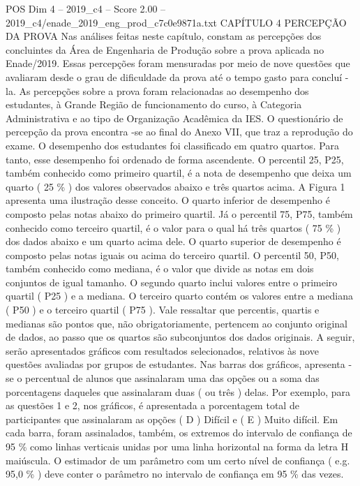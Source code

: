 \begin{textsample}{POS Dim 4 – 2019\_c4 – Score 2.00 – 2019\_c4/enade\_2019\_eng\_prod\_c7c0e9871a.txt}  \label{ex:f4_pos_117}
CAPÍTULO 4 PERCEPÇÃO DA PROVA Nas análises feitas neste capítulo, constam as percepções dos concluintes da Área de Engenharia de Produção sobre a prova aplicada no Enade/2019.
Essas percepções foram mensuradas por meio de nove questões que avaliaram desde o grau de dificuldade da prova até o tempo gasto para concluí -la.
As percepções sobre a prova foram relacionadas ao desempenho dos estudantes, à Grande Região de funcionamento do curso, à Categoria Administrativa e ao tipo de Organização Acadêmica da IES.
O questionário de percepção da prova encontra -se ao final do Anexo VII, que traz a reprodução do exame.
O desempenho dos estudantes foi classificado em quatro quartos.
Para tanto, esse desempenho foi ordenado de forma ascendente.
O percentil 25, P25, também conhecido como primeiro quartil, é a nota de desempenho que deixa um quarto ( 25 \% ) dos valores observados abaixo e três quartos acima.
A Figura 1 apresenta uma ilustração desse conceito.
O quarto inferior de desempenho é composto pelas notas abaixo do primeiro quartil.
Já o percentil 75, P75, também conhecido como terceiro quartil, é o valor para o qual há três quartos ( 75 \% ) dos dados abaixo e um quarto acima dele.
O quarto superior de desempenho é composto pelas notas iguais ou acima do terceiro quartil.
O percentil 50, P50, também conhecido como mediana, é o valor que divide as notas em dois conjuntos de igual tamanho.
O segundo quarto inclui valores entre o primeiro quartil ( P25 ) e a mediana.
O terceiro quarto contém os valores entre a mediana ( P50 ) e o terceiro quartil ( P75 ).
Vale ressaltar que percentis, quartis e medianas são pontos que, não obrigatoriamente, pertencem ao conjunto original de dados, ao passo que os quartos são subconjuntos dos dados originais.
A seguir, serão apresentados gráficos com resultados selecionados, relativos às nove questões avaliadas por grupos de estudantes.
Nas barras dos gráficos, apresenta -se o percentual de alunos que assinalaram uma das opções ou a soma das porcentagens daqueles que assinalaram duas ( ou três ) delas.
Por exemplo, para as questões 1 e 2, nos gráficos, é apresentada a porcentagem total de participantes que assinalaram as opções ( D ) Difícil e ( E ) Muito difícil.
Em cada barra, foram assinalados, também, os extremos do intervalo de confiança de 95 \% como linhas verticais unidas por uma linha horizontal na forma da letra H maiúscula.
O estimador de um parâmetro com um certo nível de confiança ( e.g. 95,0 \% ) deve conter o parâmetro no intervalo de confiança em 95 \% das vezes.

\end{textsample}
